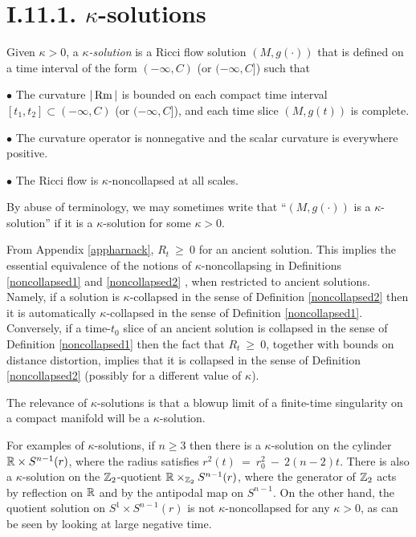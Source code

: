 \section{I.11.1. $\kappa$-solutions}
\label{secI.11.1}

\begin{definition}
  \label{def:kl-solutions-kappa-noncollapsing}

Given $\kappa > 0$, a {\em $\kappa$-solution} is a Ricci flow
solution $(M,g(\cdot))$ that is defined on a time interval of the
form $(-\infty,C)$
(or $(-\infty,C]$)
such that

$\bullet$ The curvature $|\operatorname{Rm}|$ is bounded on each compact time interval
$[t_1,t_2]\subset (-\infty,C)$
(or $(-\infty,C]$), and each time slice $(M,g(t))$ is complete.

$\bullet$ The curvature operator is nonnegative and the scalar curvature
is everywhere positive.

$\bullet$ The Ricci flow is $\kappa$-noncollapsed at all scales.
\end{definition}


By abuse of terminology, we may sometimes write that
``$(M, g(\cdot))$ is a $\kappa$-solution'' if it is a $\kappa$-solution
for some $\kappa > 0$.


From Appendix \ref{appharnack},
$R_t  \:  \ge \: 0$ for an ancient solution.
This implies the essential equivalence of the notions of
$\kappa$-noncollapsing in
Definitions \ref{noncollapsed1} and \ref{noncollapsed2} , when
restricted to ancient solutions.
Namely, if a solution is $\kappa$-collapsed in the sense of
Definition \ref{noncollapsed2} then it is
automatically $\kappa$-collapsed in the sense of
Definition \ref{noncollapsed1}.  Conversely,
if a time-$t_0$ slice of an ancient solution is collapsed in the sense
of Definition \ref{noncollapsed1}
then the fact that $R_t  \:  \ge \: 0$, together with bounds on
distance distortion, implies that it is collapsed in the sense of
Definition \ref{noncollapsed2} (possibly for a different value of $\kappa$).

The relevance of $\kappa$-solutions is that a blowup limit of a
finite-time singularity on a compact manifold will be a $\kappa$-solution.

For examples of $\kappa$-solutions, if $n \ge 3$ then
there is a $\kappa$-solution
on the cylinder ${\mathbb R} \times S^{n-1}(r)$,
where the radius satisfies $r^2(t) \: = \: r_0^2 \: - \:
2(n-2)t$. There is also a $\kappa$-solution on the
${\mathbb Z}_2$-quotient ${\mathbb R} \times_{{\mathbb Z}_2} S^{n-1}(r)$, where
the generator of ${\mathbb Z}_2$ acts by reflection on ${\mathbb R}$ and by
the antipodal map on $S^{n-1}$.
On the other hand,  the quotient solution on
$S^1 \times S^{n-1}(r)$ is not $\kappa$-noncollapsed for any
$\kappa > 0$,
as can be seen by looking at large negative time.

